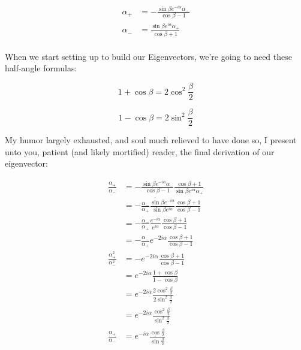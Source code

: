 \begin{answer}
  \begin{equation}
    \begin{split}
      \alpha_+ &= -\frac{\sin{\beta}e^{-i\alpha}\alpha_-}{\cos{\beta}-1}\\
      \alpha_- &= \frac{\sin{\beta}e^{i\alpha}\alpha_+}{\cos{\beta} + 1}\\
    \end{split}
  \end{equation}

  When we start setting up to build our Eigenvectors, we're going to
  need these half-angle formulas:
  
  \begin{equation}
    1 + \cos{\beta} = 2 \cos^2{\frac{\beta}{2}}
  \end{equation}

  \begin{equation}
    1 - \cos{\beta} = 2 \sin^2{\frac{\beta}{2}}
  \end{equation}

  My humor largely exhausted, and soul much relieved to have done so,
  I present unto you, patient (and likely mortified) reader, the final
  derivation of our eigenvector:
  
  \begin{equation}
    \begin{split}
      \frac{\alpha_+}{\alpha_-}
      &= -\frac{\sin{\beta}e^{-i\alpha}\alpha_-}{\cos{\beta}-1}
      \frac{\cos{\beta} + 1}{\sin{\beta}e^{i\alpha}\alpha_+}\\
      &= -\frac{\alpha_-}{\alpha_+}\frac{\sin{\beta}e^{-i\alpha}}{\sin{\beta}e^{i\alpha}}
      \frac{\cos{\beta} + 1}{\cos{\beta} - 1}\\
      &= -\frac{\alpha_-}{\alpha_+}\frac{e^{-i\alpha}}{e^{i\alpha}}
      \frac{\cos{\beta} + 1}{\cos{\beta} - 1}\\
      &= -\frac{\alpha_-}{\alpha_+}e^{-2i\alpha}
      \frac{\cos{\beta} + 1}{\cos{\beta} - 1}\\
      \frac{\alpha_+^2}{\alpha_-^2}
      &= -e^{-2i\alpha}\frac{\cos{\beta} + 1}{\cos{\beta} - 1}\\
      &= e^{-2i\alpha}\frac{1 + \cos{\beta}}{1 - \cos{\beta}}\\
      &= e^{-2i\alpha}\frac{2 \cos^2{\frac{\beta}{2}}}{2 \sin^2{\frac{\beta}{2}}}\\
      &= e^{-2i\alpha}\frac{\cos^2{\frac{\beta}{2}}}{\sin^2{\frac{\beta}{2}}}\\
      \frac{\alpha_+}{\alpha_-}
      &= e^{-i\alpha}\frac{\cos{\frac{\beta}{2}}}{\sin{\frac{\beta}{2}}}\\
    \end{split}
  \end{equation}


\end{answer}
